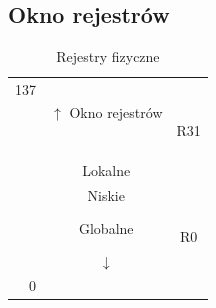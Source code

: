 \documentclass[a4paper,twoside]{article}
\begin{document}
	    \subsection*{Okno rejestrów}
	    \begin{table}[htbp]
	    	\centering
	    	\caption{Rejestry fizyczne}
	    	\begin{tabular}{r|r|r}
	    		\cline{2-2}    137   & \multirow{6}[2]{*}{$ \uparrow $ Okno rejestrów} &  \bigstrut[t]\\
	    		&       &  \\
	    		&       &  \\
	    		&       &  \bigstrut[b]\\
	    		\cline{2-2}          & \multicolumn{1}{c|}{\multirow{4}[2]{*}{Wysokie}} & \multicolumn{1}{c}{R31} \bigstrut[t]\\
	    		& \multicolumn{1}{c|}{} & \multicolumn{1}{c}{} \\
	    		& \multicolumn{1}{c|}{} & \multicolumn{1}{c}{} \\
	    		& \multicolumn{1}{c|}{} & \multicolumn{1}{c}{} \bigstrut[b]\\
	    		\cline{2-2}          & \multicolumn{1}{c|}{\multirow{4}[2]{*}{Lokalne}} & \multicolumn{1}{c}{} \bigstrut[t]\\
	    		& \multicolumn{1}{c|}{} & \multicolumn{1}{c}{} \\
	    		& \multicolumn{1}{c|}{} & \multicolumn{1}{c}{} \\
	    		& \multicolumn{1}{c|}{} & \multicolumn{1}{c}{} \bigstrut[b]\\
	    		\cline{2-2}          & \multicolumn{1}{c|}{\multirow{4}[2]{*}{Niskie}} & \multicolumn{1}{c}{} \bigstrut[t]\\
	    		& \multicolumn{1}{c|}{} & \multicolumn{1}{c}{} \\
	    		& \multicolumn{1}{c|}{} & \multicolumn{1}{c}{} \\
	    		& \multicolumn{1}{c|}{} & \multicolumn{1}{c}{} \bigstrut[b]\\
	    		\cline{2-2}          & \multicolumn{1}{c|}{\multirow{4}[2]{*}{Globalne}} & \multicolumn{1}{c}{} \bigstrut[t]\\
	    		& \multicolumn{1}{c|}{} & \multicolumn{1}{c}{} \\
	    		& \multicolumn{1}{c|}{} & \multicolumn{1}{c}{} \\
	    		& \multicolumn{1}{c|}{} & \multicolumn{1}{c}{R0} \bigstrut[b]\\
	    		\cline{2-2}          & \multicolumn{1}{c|}{\multirow{2}[2]{*}{$ \downarrow $ }} &  \bigstrut[t]\\
	    		& \multicolumn{1}{c|}{} &  \\
	    		0     & \multicolumn{1}{c|}{} &  \bigstrut[b]\\
	    		\cline{2-2}    \end{tabular}%
	    	\label{tab:addlabel}%
	    \end{table}
	    
\end{document}
